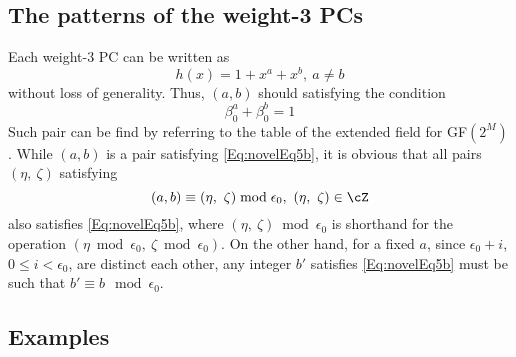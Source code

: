 \subsection{The patterns of the weight-3 PCs}

Each weight-3 PC can be written as 
\begin{equation}
h(x)=1+x^a+x^b,~a\neq b
\label{novelEqwt3}
\end{equation}
without loss of generality. 
Thus, $(a,b)$ should satisfying the condition
\begin{equation}
\beta_0^a+\beta_0^b= 1
\label{Eq:novelEq5b}
\end{equation}
Such pair can be find by referring to the table of the extended field for GF$(2^M)$. 
While $(a,b)$ is a pair satisfying \eqref{Eq:novelEq5b}, it is obvious that all pairs $(\eta,~\zeta)$ satisfying
\begin{equation}
(a,b) \equiv (\eta,~\zeta) \bmod \epsilon_0,~(\eta,~\zeta)\in \cZ
\end{equation}
also satisfies \eqref{Eq:novelEq5b}, where $(\eta,~\zeta) \bmod \epsilon_0$ is shorthand for the operation $(\eta \bmod \epsilon_0,~\zeta \bmod \epsilon_0)$. On the other hand, for a fixed $a$, since $\epsilon_0+i$, $0 \leq i < \epsilon_0$, are distinct each other, any integer $b'$ satisfies \eqref{Eq:novelEq5b} must be such that $b'\equiv b \mod \epsilon_0$.

\subsection{Examples}

